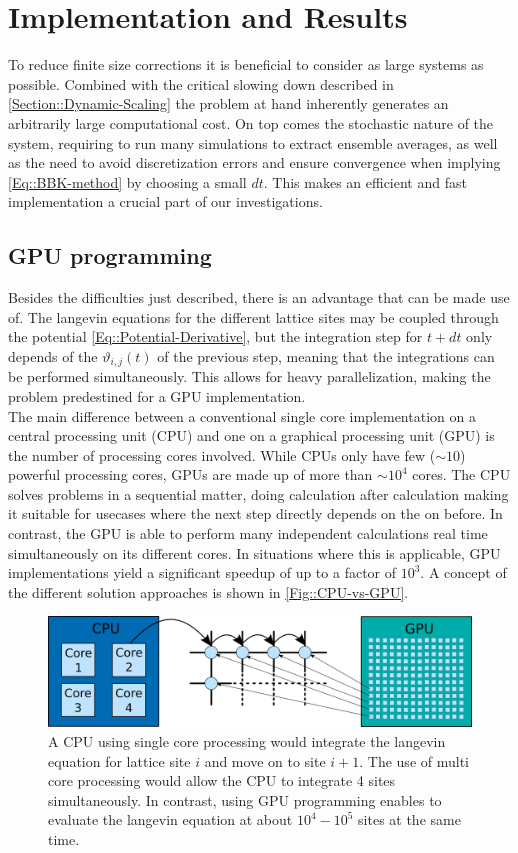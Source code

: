 	\chapter{Implementation and Results} \label{Chapter::Implementation-Results}
	To reduce finite size corrections it is beneficial to consider as large systems as possible. Combined with the critical slowing down described in  \autoref{Section::Dynamic-Scaling} the problem at hand inherently generates an arbitrarily large computational cost. On top comes the stochastic nature of the system, requiring to run many simulations to extract ensemble averages, as well as the need to avoid discretization errors and ensure convergence when implying \autoref{Eq::BBK-method} by choosing a small $dt$. This makes an efficient and fast implementation a crucial part of our investigations.
	\section{GPU programming}
	Besides the difficulties just described, there is an advantage that can be made use of. The langevin equations for the different lattice sites may be coupled through the potential \autoref{Eq::Potential-Derivative}, but the integration step for $t + dt$ only depends of the $\vartheta_{i, j}(t)$ of the previous step, meaning that the integrations can be performed simultaneously. This allows for heavy parallelization, making the problem predestined for a GPU implementation. \\
	
	The main difference between a conventional single core implementation on a central processing unit (CPU) and one on a graphical processing unit (GPU) is the number of processing cores involved. While CPUs only have few ($\sim 10$) powerful processing cores, GPUs are made up of more than $\sim 10^4$ cores. The CPU solves problems in a sequential matter, doing calculation after calculation making it suitable for usecases where the next step directly depends on the on before. In contrast, the GPU is able to perform many independent calculations real time simultaneously on its different cores. In situations where this is applicable, GPU implementations yield a significant speedup of up to a factor of $10^3$. A concept of the different solution approaches is shown in \autoref{Fig::CPU-vs-GPU}.\\
	\begin{figure}[htp]
		\centering
		\includegraphics[width=0.8\linewidth]{graphics/CPU-vs-GPU.png}
		\caption{A CPU using single core processing would integrate the langevin equation for lattice site $i$ and move on to site $i+1$. The use of multi core processing would allow the CPU to integrate 4 sites simultaneously. In contrast, using GPU programming enables to evaluate the langevin equation at about $10^4 - 10^5$ sites at the same time.}
		\label{Fig::CPU-vs-GPU}
	\end{figure}
	

